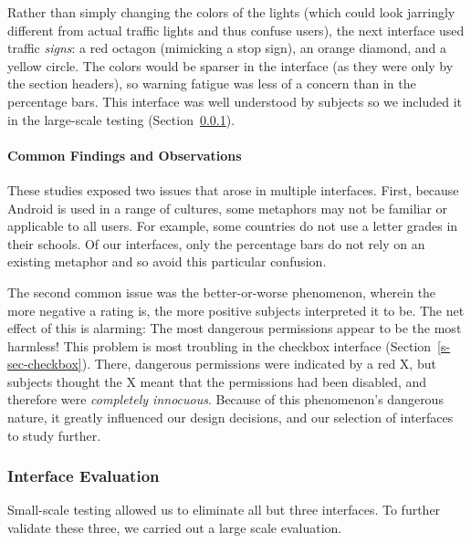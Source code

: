 \documentclass[11pt]{article}
\newcommand{\refsec}[1]{Section~\ref{#1}}
\begin{document}
\label{ss-sec-traffic-r4}

Rather than simply changing the colors of
the lights (which  
could look jarringly different from actual traffic lights and thus confuse users), 
the next interface used traffic \emph{signs}: a red octagon
(mimicking a stop sign), an orange diamond, and a yellow circle. 
The colors would be sparser in the interface (as they were only by the section 
headers), so warning fatigue was less of
a concern than in the percentage bars. 
This interface was well understood by subjects so we included it
in the large-scale testing (\refsec{s-sec-largescale}).


\paragraph{Common Findings and Observations}
\label{common-findings}

These studies exposed two issues that arose in multiple 
interfaces. First, because Android is used in a range of 
cultures, some metaphors may not be familiar or applicable to all users.
For example, some countries 
do not use a letter grades in their schools.
Of our interfaces, only the percentage bars do 
not rely on an existing metaphor and so avoid this particular confusion.

The second common issue was the better-or-worse phenomenon, 
wherein the more negative a rating is, the more positive subjects interpreted 
it to be. The net effect of this is alarming: The most dangerous permissions 
appear to be the most harmless! This problem is 
most troubling in the checkbox interface (\refsec{s-sec-checkbox}). 
There, dangerous permissions were indicated by a red X, but 
subjects thought the X meant that the permissions had been disabled, and therefore 
were \emph{completely innocuous}. Because of this phenomenon's dangerous nature, it greatly 
influenced our design decisions, and our selection of interfaces to study further.



\subsubsection{Interface Evaluation}
\label{s-sec-largescale}

Small-scale testing allowed us to eliminate all but three interfaces. 
To further validate these three, we carried out a large scale evaluation.
\end{document}
